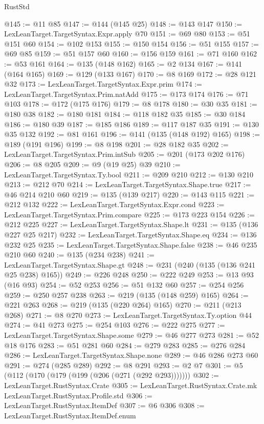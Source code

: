 \begin{lexlean}{RustStd}
\begin{coremodule}
@145 := @11 @85
@147 := @144 (@145 @25)
@148 := @143 @147
@150 := LexLeanTarget.TargetSyntax.Expr.apply @70
@151 := @69 @80
@153 := @51 @151 @60
@154 := @102 @153
@155 := @150 @154
@156 := @51 @155
@157 := @69 @85
@159 := @51 @157 @60
@160 := @156 @159
@161 := @71 @160
@162 := @53 @161
@164 := @135 (@148 @162)
@165 := @2 @134
@167 := @141 (@164 @165)
@169 := @129 (@133 @167)
@170 := @8 @169
@172 := @28 @121 @32
@173 := LexLeanTarget.TargetSyntax.Expr.prim
@174 := LexLeanTarget.TargetSyntax.Prim.natAdd
@175 := @173 @174
@176 := @71 @103
@178 := @172 (@175 @176)
@179 := @8 @178
@180 := @30 @35
@181 := @180 @38
@182 := @180 @181
@184 := @118 @182 @35
@185 := @30 @184
@186 := @180 @39
@187 := @185 @186
@189 := @117 @187 @35
@191 := @130 @35 @132
@192 := @81 @161
@196 := @141 (@135 (@148 @192) @165)
@198 := @189 (@191 @196)
@199 := @8 @198
@201 := @28 @182 @35
@202 := LexLeanTarget.TargetSyntax.Prim.intSub
@205 := @201 (@173 @202 @176)
@206 := @8 @205
@209 := @9 (@19 @25) @39
@210 := LexLeanTarget.TargetSyntax.Ty.bool
@211 := @209 @210
@212 := @130 @210
@213 := @212 @70
@214 := LexLeanTarget.TargetSyntax.Shape.true
@217 := @46 @214 @210 @60
@219 := @135 (@139 @217)
@220 := @143 @115
@221 := @212 @132
@222 := LexLeanTarget.TargetSyntax.Expr.cond
@223 := LexLeanTarget.TargetSyntax.Prim.compare
@225 := @173 @223 @154
@226 := @212 @225
@227 := LexLeanTarget.TargetSyntax.Shape.lt
@231 := @135 (@136 @227 @25 @217)
@232 := LexLeanTarget.TargetSyntax.Shape.eq
@234 := @136 @232 @25
@235 := LexLeanTarget.TargetSyntax.Shape.false
@238 := @46 @235 @210 @60
@240 := @135 (@234 @238)
@241 := LexLeanTarget.TargetSyntax.Shape.gt
@248 := @231 (@240 (@135 (@136 @241 @25 @238) @165))
@249 := @226 @248
@250 := @222 @249
@253 := @13 @93 (@16 @93)
@254 := @52 @253
@256 := @51 @132 @60
@257 := @254 @256
@259 := @250 @257 @238
@263 := @219 (@135 (@148 @259) @165)
@264 := @221 @263
@268 := @219 (@135 (@220 @264) @165)
@270 := @211 (@213 @268)
@271 := @8 @270
@273 := LexLeanTarget.TargetSyntax.Ty.option @44
@274 := @41 @273
@275 := @254 @103
@276 := @222 @275
@277 := LexLeanTarget.TargetSyntax.Shape.some
@279 := @46 @277 @273
@281 := @52 @18 @176
@283 := @51 @281 @60
@284 := @279 @283
@285 := @276 @284
@286 := LexLeanTarget.TargetSyntax.Shape.none
@289 := @46 @286 @273 @60
@291 := @274 (@285 @289)
@292 := @8 @291
@293 := @2 @7
@301 := @5 (@112 (@170 (@179 (@199 (@206 (@271 (@292 @293)))))))
@302 := LexLeanTarget.RustSyntax.Crate
@305 := LexLeanTarget.RustSyntax.Crate.mk LexLeanTarget.RustSyntax.Profile.std
@306 := LexLeanTarget.RustSyntax.ItemDef
@307 := @6 @306
@308 := LexLeanTarget.RustSyntax.ItemDef.enum

\end{coremodule}
\end{lexlean}
